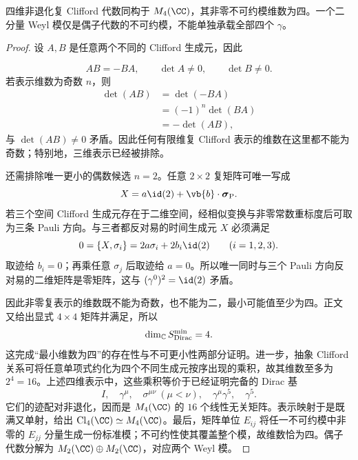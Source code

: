 \begin{theorem}
四维非退化复 Clifford 代数同构于 $M_4(\CC)$，其非零不可约模维数为四。一个二分量 Weyl 模仅是偶子代数的不可约模，不能单独承载全部四个 $\gamma$。
\end{theorem}

\begin{proof}
设 $A,B$ 是任意两个不同的 Clifford 生成元，因此

\begin{equation*}
 AB=-BA,
 \qquad
 \det A\neq0,
 \qquad
 \det B\neq0.
\end{equation*}
若表示维数为奇数 $n$，则
\begin{align*}
 \det(AB)
 &=\det(-BA)\\
 &=(-1)^n\det(BA)\\
 &=-\det(AB),
\end{align*}
与 $\det(AB)\neq0$ 矛盾。因此任何有限维复 Clifford 表示的维数在这里都不能为奇数；特别地，三维表示已经被排除。

还需排除唯一更小的偶数候选 $n=2$。任意 $2\times2$ 复矩阵可唯一写成
\begin{equation*}
 X=a\id(2)+\vb{b}\cdot\boldsymbol\sigma_{\rm P}.
\end{equation*}
若三个空间 Clifford 生成元存在于二维空间，经相似变换与非零常数重标度后可取为三条 Pauli 方向。与三者都反对易的时间生成元 $X$ 必须满足
\begin{equation*}
 0=\{X,\sigma_i\}
 =2a\sigma_i+2b_i\id(2)
 \qquad(i=1,2,3).
\end{equation*}
取迹给 $b_i=0$；再乘任意 $\sigma_j$ 后取迹给 $a=0$。所以唯一同时与三个 Pauli 方向反对易的二维矩阵是零矩阵，这与 $(\gamma^0)^2=\id(2)$ 矛盾。

因此非零复表示的维数既不能为奇数，也不能为二，最小可能值至少为四。正文 又给出显式 $4\times4$ 矩阵并满足，所以
\begin{equation*}
 \dim_{\mathbb C}S_{\rm Dirac}^{\rm min}=4.
\end{equation*}
这完成“最小维数为四”的存在性与不可更小性两部分证明。进一步，抽象 Clifford 关系可将任意单项式约化为四个不同生成元按序出现的乘积，故其维数至多为 $2^4=16$。上述四维表示中，这些乘积等价于已经证明完备的 Dirac 基
\[
I,\quad\gamma^\mu,\quad\sigma^{\mu\nu}\ (\mu<\nu),\quad\gamma^\mu\gamma^5,\quad\gamma^5.
\]
它们的迹配对非退化，因而是 $M_4(\CC)$ 的 $16$ 个线性无关矩阵。表示映射于是既满又单射，给出 $\mathrm{Cl}_4(\CC)\simeq M_4(\CC)$。最后，矩阵单位 $E_{ij}$ 将任一不可约模中非零的 $E_{jj}$ 分量生成一份标准模；不可约性使其覆盖整个模，故维数恰为四。偶子代数分解为 $M_2(\CC)\oplus M_2(\CC)$，对应两个 Weyl 模。
\end{proof}


